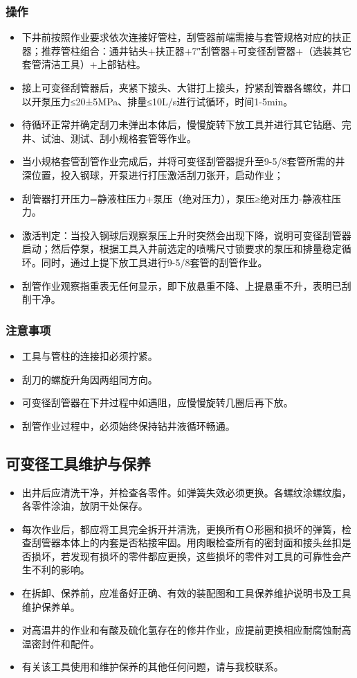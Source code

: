 \subsubsection{操作}
\begin{itemize}
	\item 	下井前按照作业要求依次连接好管柱，刮管器前端需接与套管规格对应的扶正器；推荐管柱组合：通井钻头+扶正器+7″刮管器+可变径刮管器+（选装其它套管清洁工具）+上部钻柱。
	\item 接上可变径刮管器后，夹紧下接头、大钳打上接头，拧紧刮管器各螺纹，井口以开泵压力≤20±5MPa、排量≤10L/s进行试循环，时间1-5min。
	\item 待循环正常并确定刮刀未弹出本体后，慢慢旋转下放工具并进行其它钻磨、完井、试油、测试、刮小规格套管等作业。
	\item 当小规格套管刮管作业完成后，并将可变径刮管器提升至9-5/8\inch 套管所需的井深位置，投入钢球，开泵进行打压激活刮刀张开，启动作业；
	\item 刮管器打开压力=静液柱压力+泵压（绝对压力），泵压≥绝对压力-静液柱压力。
	\item 激活判定：当投入钢球后观察泵压上升时突然会出现下降，说明可变径刮管器启动；然后停泵，根据工具入井前选定的喷嘴尺寸锁要求的泵压和排量稳定循环。同时，通过上提下放工具进行9-5/8\inch 套管的刮管作业。
	\item 刮管作业观察指重表无任何显示，即下放悬重不降、上提悬重不升，表明已刮削干净。
\end{itemize}

\subsubsection{注意事项}
\begin{itemize}
	\item 工具与管柱的连接扣必须拧紧。
	\item 刮刀的螺旋升角因两组同方向。
	\item 可变径刮管器在下井过程中如遇阻，应慢慢旋转几圈后再下放。
	\item 刮管作业过程中，必须始终保持钻井液循环畅通。
\end{itemize}

\subsection{可变径工具维护与保养}
\begin{itemize}
	\item 出井后应清洗干净，并检查各零件。如弹簧失效必须更换。各螺纹涂螺纹脂，各零件涂油，放阴干处保存。
	\item 每次作业后，都应将工具完全拆开并清洗，更换所有Ｏ形圈和损坏的弹簧，检查刮管器本体上的内套是否粘接牢固。用肉眼检查所有的密封面和接头丝扣是否损坏，若发现有损坏的零件都应更换，这些损坏的零件对工具的可靠性会产生不利的影响。
	\item 在拆卸、保养前，应准备好正确、有效的装配图和工具保养维护说明书及工具维护保养单。
	\item 对高温井的作业和有酸及硫化氢存在的修井作业，应提前更换相应耐腐蚀耐高温密封件和配件。
	\item 有关该工具使用和维护保养的其他任何问题，请与我校联系。
\end{itemize}

